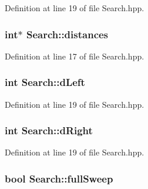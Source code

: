 Definition at line 19 of file Search.\-hpp.

\hypertarget{classSearch_acae7260fec1cd49350860f94955b1e63}{
\subsubsection[{distances}]{\setlength{\rightskip}{0pt plus 5cm}int$\ast$ Search\-::distances\hspace{0.3cm}{\ttfamily [private]}}}\label{classSearch_acae7260fec1cd49350860f94955b1e63}


Definition at line 17 of file Search.\-hpp.

\hypertarget{classSearch_aeab525e9821cdb2dc5ed996a207d9084}{
\subsubsection[{d\-Left}]{\setlength{\rightskip}{0pt plus 5cm}int Search\-::d\-Left\hspace{0.3cm}{\ttfamily [private]}}}\label{classSearch_aeab525e9821cdb2dc5ed996a207d9084}


Definition at line 19 of file Search.\-hpp.

\hypertarget{classSearch_a376def82b93387197752cc169ddf060e}{
\subsubsection[{d\-Right}]{\setlength{\rightskip}{0pt plus 5cm}int Search\-::d\-Right\hspace{0.3cm}{\ttfamily [private]}}}\label{classSearch_a376def82b93387197752cc169ddf060e}


Definition at line 19 of file Search.\-hpp.

\hypertarget{classSearch_a113ce5d7076372bbe5041749f42a7ee3}{
\subsubsection[{full\-Sweep}]{\setlength{\rightskip}{0pt plus 5cm}bool Search\-::full\-Sweep\hspace{0.3cm}{\ttfamily [private]}}}\label{classSearch_a113ce5d7076372bbe5041749f42a7ee3}


